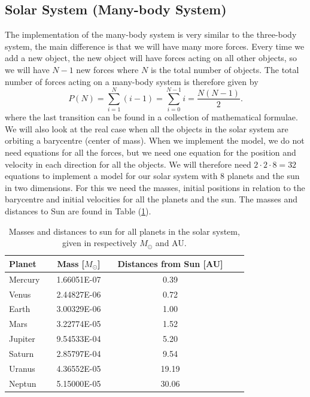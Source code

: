 \documentclass[norsk,a4paper,12pt]{article}
\begin{document}
\subsection{Solar System (Many-body System)}
The implementation of the many-body system is very similar to the three-body system, the main difference is that we will have many more forces. Every time we add a new object, the new object will have forces acting on all other objects, so we will have $N-1$ new forces where $N$ is the total number of objects. The total number of forces acting on a many-body system is therefore given by
\begin{equation}
P(N)=\sum_{i=1}^N(i-1)=\sum_{i=0}^{N-1}i=\frac{N(N-1)}{2}.
\end{equation}
where the last transition can be found in a collection of mathematical formulae.  We will also look at the real case when all the objects in the solar system are orbiting a barycentre (center of mass). When we implement the model, we do not need equations for all the forces, but we need one equation for the position and velocity in each direction for all the objects. We will therefore need $2\cdot2\cdot8=32$ equations to implement a model for our solar system with 8 planets and the sun in two dimensions. For this we need the masses, initial positions in relation to the barycentre and initial velocities for all the planets and the sun. The masses and distances to Sun are found in Table (\ref{tab:Masses}).
\begin{table}[H]
\centering
\caption{Masses and distances to sun for all planets in the solar system, given in respectively $M_\odot$ and AU.}
\label{tab:Masses} 
\begin{tabularx}{\textwidth}{lXcccXr}
\toprule
Planet  &   & Mass [$M_\odot$] &    & Distances from Sun [AU] \\
\midrule
Mercury 	&	& 1.66051E-07  &    & 0.39    \\
Venus   &   & 2.44827E-06  &    & 0.72    \\
Earth   &   & 3.00329E-06  &    & 1.00    \\
Mars    &   & 3.22774E-05  &    & 1.52    \\
Jupiter &   & 9.54533E-04  &    & 5.20    \\
Saturn 	&	& 2.85797E-04  &    & 9.54    \\
Uranus 	&	& 4.36552E-05  &    & 19.19   \\
Neptun  &	& 5.15000E-05  &    & 30.06   \\
\bottomrule
\end{tabularx}
\end{table}
\end{document}
